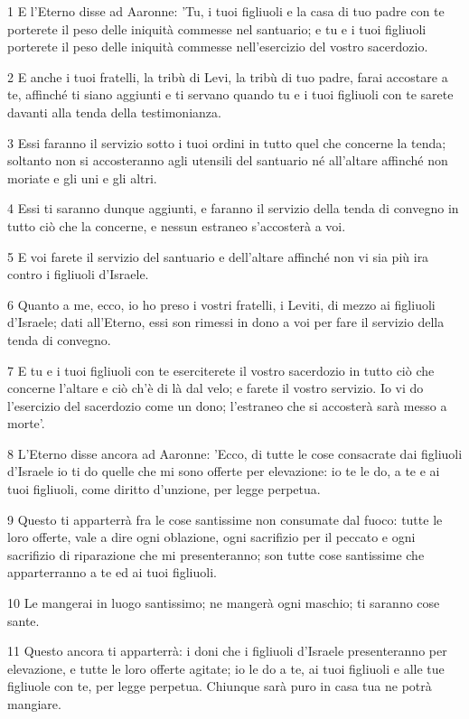 \par 1 E l'Eterno disse ad Aaronne: 'Tu, i tuoi figliuoli e la casa di tuo padre con te porterete il peso delle iniquità commesse nel santuario; e tu e i tuoi figliuoli porterete il peso delle iniquità commesse nell'esercizio del vostro sacerdozio.
\par 2 E anche i tuoi fratelli, la tribù di Levi, la tribù di tuo padre, farai accostare a te, affinché ti siano aggiunti e ti servano quando tu e i tuoi figliuoli con te sarete davanti alla tenda della testimonianza.
\par 3 Essi faranno il servizio sotto i tuoi ordini in tutto quel che concerne la tenda; soltanto non si accosteranno agli utensili del santuario né all'altare affinché non moriate e gli uni e gli altri.
\par 4 Essi ti saranno dunque aggiunti, e faranno il servizio della tenda di convegno in tutto ciò che la concerne, e nessun estraneo s'accosterà a voi.
\par 5 E voi farete il servizio del santuario e dell'altare affinché non vi sia più ira contro i figliuoli d'Israele.
\par 6 Quanto a me, ecco, io ho preso i vostri fratelli, i Leviti, di mezzo ai figliuoli d'Israele; dati all'Eterno, essi son rimessi in dono a voi per fare il servizio della tenda di convegno.
\par 7 E tu e i tuoi figliuoli con te eserciterete il vostro sacerdozio in tutto ciò che concerne l'altare e ciò ch'è di là dal velo; e farete il vostro servizio. Io vi do l'esercizio del sacerdozio come un dono; l'estraneo che si accosterà sarà messo a morte'.
\par 8 L'Eterno disse ancora ad Aaronne: 'Ecco, di tutte le cose consacrate dai figliuoli d'Israele io ti do quelle che mi sono offerte per elevazione: io te le do, a te e ai tuoi figliuoli, come diritto d'unzione, per legge perpetua.
\par 9 Questo ti apparterrà fra le cose santissime non consumate dal fuoco: tutte le loro offerte, vale a dire ogni oblazione, ogni sacrifizio per il peccato e ogni sacrifizio di riparazione che mi presenteranno; son tutte cose santissime che apparterranno a te ed ai tuoi figliuoli.
\par 10 Le mangerai in luogo santissimo; ne mangerà ogni maschio; ti saranno cose sante.
\par 11 Questo ancora ti apparterrà: i doni che i figliuoli d'Israele presenteranno per elevazione, e tutte le loro offerte agitate; io le do a te, ai tuoi figliuoli e alle tue figliuole con te, per legge perpetua. Chiunque sarà puro in casa tua ne potrà mangiare.
